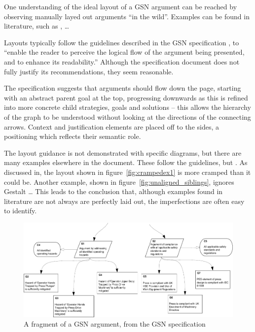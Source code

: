 One understanding of the ideal layout of a GSN argument can be reached by observing manually layed out arguments ``in the wild''.
Examples can be found in literature, such as \citet{insilico}, \citet{Habli:2006:PPC:1183088.1183090} \ldots

Layouts typically follow the guidelines described in the GSN specification \citep[section~2.2, pp.~26--27]{gsnstandard}, to ``enable the reader to perceive the logical flow of the argument being presented, and to enhance its readability.''
Although the specification document does not fully justify its recommendations, they seem reasonable.

The specification suggests that arguments should flow down the page, starting with an abstract parent goal at the top, progressing downwards as this is refined into more concrete child strategies, goals and solutions -- this allows the hierarchy of the graph to be understood without looking at the directions of the connecting arrows.
Context and justification elements are placed off to the sides, a positioning which reflects their semantic role.

The layout guidance is not demonstrated with specific diagrams, but there are many examples elsewhere in the document.
These follow the guidelines, but . As discussed in, the layout shown in figure~\ref{fig:crampedex1} is more cramped than it could be.
Another example, shown in figure~\ref{fig:unaligned_siblings}, ignores  Gestalt  \ldots
This leads to the conclusion that, although examples found in literature are not always are perfectly laid out, the imperfections are often easy to identify.

\begin{figure}
    \includegraphics[width=\textwidth]{graphics/unaligned_siblings.pdf}
    \caption{A fragment of a GSN argument,
            from the GSN specification \citep[figure~42, section~2.3.6.5, pp.~34]{gsnstandard}}
    \label{fig:unalignedsiblings}
\end{figure}

